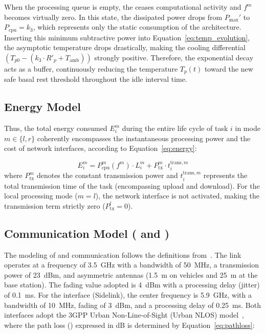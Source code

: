 When the processing queue is empty, the  ceases computational activity and $f^m$ becomes virtually zero. In this state, the dissipated power drops from $P_{\max}'$ to $P_{\mathrm{cpu}} = k_3$, which represents only the static consumption of the architecture. Inserting this minimum subtractive power into Equation~\ref{eq:temp_evolution}, the asymptotic temperature drops drastically, making the cooling differential $(T_{p0} - (k_3 \cdot R'_p + T_{\mathrm{amb}}))$ strongly positive. Therefore, the exponential decay acts as a buffer, continuously reducing the temperature $T_p(t)$ toward the new safe basal rest threshold throughout the idle interval time.

\subsection{Energy Model}

Thus, the total energy consumed $E_i^m$ during the entire life cycle of task $i$ in mode $m \in \{l, r\}$ coherently encompasses the instantaneous processing power and the cost of network interfaces, according to Equation~\ref{eq:energy}:

\begin{equation}
\label{eq:energy}
E_i^m = P_{\mathrm{cpu}}^m(f^m) \cdot L_i^m + P_{\mathrm{tx}}^m \cdot t_i^{\mathrm{trans},m}
\end{equation}
where $P_{\mathrm{tx}}^m$ denotes the constant transmission power and $t_i^{\mathrm{trans},m}$ represents the total transmission time of the task (encompassing upload and download). For the local processing mode ($m=l$), the network interface is not activated, making the transmission term strictly zero ($P_{\mathrm{tx}}^l = 0$).

\subsection{Communication Model ( and )}

The modeling of  and  communication follows the definitions from~\cite{3gpp38901, yan2024towards}. The  link operates at a frequency of \SI{3.5}{\giga\hertz} with a bandwidth of \SI{50}{\mega\hertz}, a transmission power of \SI{23}{dBm}, and asymmetric antennas (\SI{1.5}{\meter} on vehicles and \SI{25}{\meter} at the base station). The fading value adopted is \SI{4}{dBm} with a processing delay (jitter) of \SI{0.1}{\milli\second}. For the  interface (Sidelink), the center frequency is \SI{5.9}{\giga\hertz}, with a bandwidth of \SI{10}{\mega\hertz}, fading of \SI{3}{dBm}, and a processing delay of \SI{0.25}{\milli\second}. Both interfaces adopt the 3GPP Urban Non-Line-of-Sight (Urban NLOS) model~\cite{3gpp38901}, where the path loss () expressed in dB is determined by Equation~\ref{eq:pathloss}:

